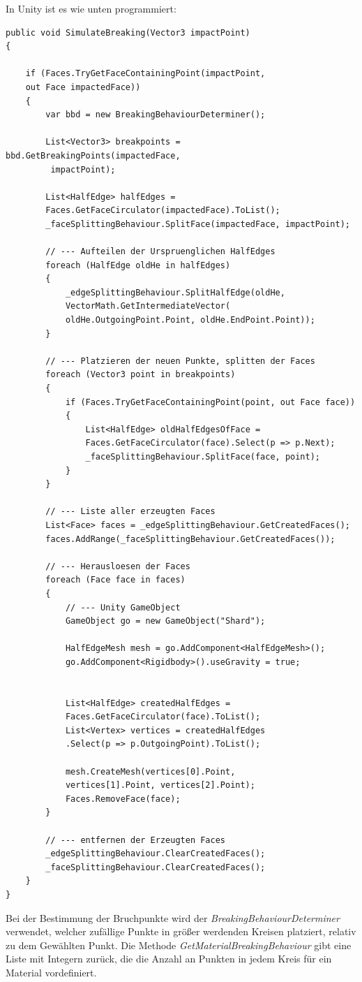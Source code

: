 In Unity ist es wie unten programmiert:
\begin{lstlisting}
public void SimulateBreaking(Vector3 impactPoint)
{

	if (Faces.TryGetFaceContainingPoint(impactPoint, 
	out Face impactedFace))
	{
		var bbd = new BreakingBehaviourDeterminer();

		List<Vector3> breakpoints = bbd.GetBreakingPoints(impactedFace,
		 impactPoint);
		 
		List<HalfEdge> halfEdges =
		Faces.GetFaceCirculator(impactedFace).ToList();
		_faceSplittingBehaviour.SplitFace(impactedFace, impactPoint);

		// --- Aufteilen der Urspruenglichen HalfEdges
		foreach (HalfEdge oldHe in halfEdges)
		{
			_edgeSplittingBehaviour.SplitHalfEdge(oldHe,
			VectorMath.GetIntermediateVector(
			oldHe.OutgoingPoint.Point, oldHe.EndPoint.Point));
		}

		// --- Platzieren der neuen Punkte, splitten der Faces
		foreach (Vector3 point in breakpoints)
		{
			if (Faces.TryGetFaceContainingPoint(point, out Face face))
			{
				List<HalfEdge> oldHalfEdgesOfFace = 
				Faces.GetFaceCirculator(face).Select(p => p.Next);
				_faceSplittingBehaviour.SplitFace(face, point);
			}
		}
	
		// --- Liste aller erzeugten Faces
		List<Face> faces = _edgeSplittingBehaviour.GetCreatedFaces();
		faces.AddRange(_faceSplittingBehaviour.GetCreatedFaces());
	
		// --- Herausloesen der Faces
		foreach (Face face in faces)
		{
			// --- Unity GameObject
			GameObject go = new GameObject("Shard");
	
			HalfEdgeMesh mesh = go.AddComponent<HalfEdgeMesh>();
			go.AddComponent<Rigidbody>().useGravity = true;
	
	
			List<HalfEdge> createdHalfEdges = 
			Faces.GetFaceCirculator(face).ToList();
			List<Vertex> vertices = createdHalfEdges
			.Select(p => p.OutgoingPoint).ToList();
	
			mesh.CreateMesh(vertices[0].Point, 
			vertices[1].Point, vertices[2].Point);
			Faces.RemoveFace(face);
		}
		
		// --- entfernen der Erzeugten Faces
		_edgeSplittingBehaviour.ClearCreatedFaces();
		_faceSplittingBehaviour.ClearCreatedFaces();
	}
}
\end{lstlisting}
Bei der Bestimmung der Bruchpunkte wird der \textit{BreakingBehaviourDeterminer} verwendet, welcher zuf\"allige Punkte in gr\"o{\ss}er werdenden Kreisen platziert, relativ zu dem Gew\"ahlten Punkt. Die Methode \textit{GetMaterialBreakingBehaviour} gibt eine Liste mit Integern zur\"uck, die die Anzahl an Punkten in jedem Kreis f\"ur ein Material vordefiniert.

